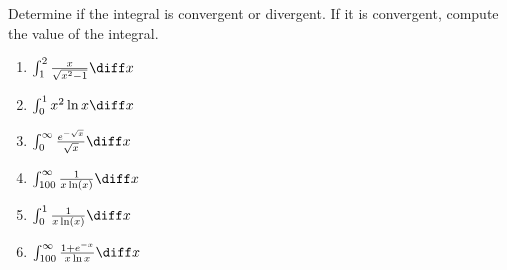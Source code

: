 Determine if the integral is convergent or divergent. If it is convergent, compute the value of the integral.

\begin{enumerate}
\item $\int_{1}^{2} \frac{x}{\sqrt{x^2-1}}\diff x$ 
\item $\int_{0}^{1} x^2\ln x\diff x$ 
\item $\int_{0}^{\infty} \frac{e^{-\sqrt{x}}}{\sqrt{x}}\diff x $ 
\item $\int_{100}^{\infty} \frac{1}{x\ln(x)}\diff x $ 
\item $\int_{0}^{1} \frac{1}{x\ln(x)}\diff x $ 
\item $\int_{100}^{\infty} \frac{1+e^{-x}}{x\ln x }\diff x $ 
\end{enumerate}